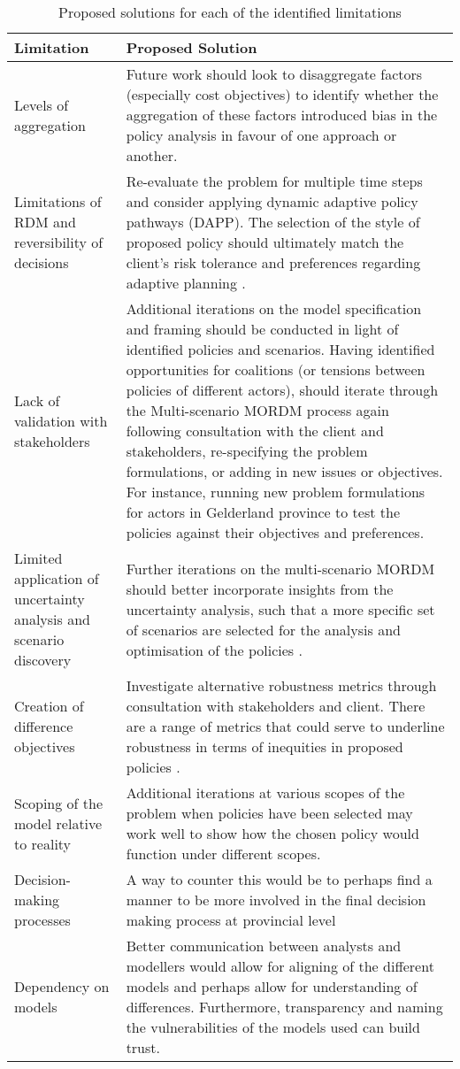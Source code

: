 \begin{table}[h]
\caption{Proposed solutions for each of the identified limitations}
\label{tab:Proposed Solutions}
\centering
\begin{tabular}{p{}|p{}}
\textbf{Limitation} & \textbf{Proposed Solution}  \\ \hline
Levels of aggregation & Future work should look to disaggregate factors (especially cost objectives) to identify whether the aggregation of these factors introduced bias in the policy analysis in favour of one approach or another. \\ \hline
Limitations of RDM and reversibility of decisions & Re-evaluate the problem for multiple time steps and consider applying dynamic adaptive policy pathways (DAPP). The selection of the style of proposed policy should ultimately match the client's risk tolerance and preferences regarding adaptive planning \parencite{marchau_decision_2019}. \\ \hline
Lack of validation with stakeholders &Additional iterations on the model specification and framing should be conducted in light of identified policies and scenarios. Having identified opportunities for coalitions (or tensions between policies of different actors), should iterate through the Multi-scenario MORDM process again following consultation with the client and stakeholders, re-specifying the problem formulations, or adding in new issues or objectives. For instance, running new problem formulations for actors in Gelderland province to test the policies against their objectives and preferences. \\ \hline
Limited application of uncertainty analysis and scenario discovery & Further iterations on the multi-scenario MORDM should better incorporate insights from the uncertainty analysis, such that a more specific set of scenarios are selected for the analysis and optimisation of the policies \parencite{watson_incorporating_2017, eker_including_2018}. \\ \hline
Creation of difference objectives & Investigate alternative robustness metrics through consultation with stakeholders and client. There are a range of metrics that could serve to underline robustness in terms of inequities in proposed policies \parencite{mcphail_robustness_2018}. \\ \hline
Scoping of the model relative to reality & Additional iterations at various scopes of the problem when policies have been selected may work well to show how the chosen policy would function under different scopes.        \\ \hline
Decision-making processes & A way to counter this would be to perhaps find a manner to be more involved in the final decision making process at provincial level   \\ \hline
Dependency on models &  Better communication between analysts and modellers would allow for aligning of the different models and perhaps allow for understanding of differences. Furthermore, transparency and naming the vulnerabilities of the models used can build trust. \parencite{saltelli_five_2020}               
\end{tabular}
\end{table}